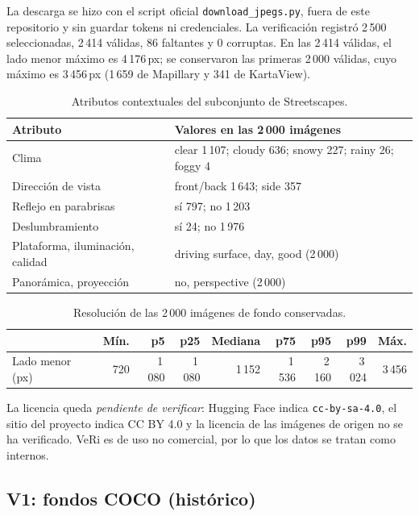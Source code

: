 \documentclass[11pt,a4paper]{article}
\begin{document}
La descarga se hizo con el script oficial \texttt{download\_jpegs.py}, fuera de este
repositorio y sin guardar tokens ni credenciales. La verificaci\'on registr\'o 2\,500
seleccionadas, 2\,414 v\'alidas, 86 faltantes y 0 corruptas. En las 2\,414 v\'alidas, el
lado menor m\'aximo es 4\,176\,px; se conservaron las primeras 2\,000 v\'alidas, cuyo
m\'aximo es 3\,456\,px (1\,659 de Mapillary y 341 de KartaView).

\begin{table}[ht]
\centering
\begin{tabular}{@{}ll@{}}
\toprule
Atributo & Valores en las 2\,000 im\'agenes \\
\midrule
Clima & clear 1\,107; cloudy 636; snowy 227; rainy 26; foggy 4 \\
Direcci\'on de vista & front/back 1\,643; side 357 \\
Reflejo en parabrisas & s\'i 797; no 1\,203 \\
Deslumbramiento & s\'i 24; no 1\,976 \\
Plataforma, iluminaci\'on, calidad & driving surface, day, good (2\,000) \\
Panor\'amica, proyecci\'on & no, perspective (2\,000) \\
\bottomrule
\end{tabular}
\caption{Atributos contextuales del subconjunto de Streetscapes.}
\end{table}

\begin{table}[ht]
\centering
\begin{tabular}{@{}lrrrrrrrr@{}}
\toprule
 & M\'in. & p5 & p25 & Mediana & p75 & p95 & p99 & M\'ax. \\
\midrule
Lado menor (px) & 720 & 1\,080 & 1\,080 & 1\,152 & 1\,536 & 2\,160 & 3\,024 & 3\,456 \\
\bottomrule
\end{tabular}
\caption{Resoluci\'on de las 2\,000 im\'agenes de fondo conservadas.}
\end{table}

La licencia queda \emph{pendiente de verificar}: Hugging Face indica \texttt{cc-by-sa-4.0},
el sitio del proyecto indica CC BY 4.0 y la licencia de las im\'agenes de origen no se ha
verificado. VeRi es de uso no comercial, por lo que los datos se tratan como internos.

\subsection{V1: fondos COCO (hist\'orico)}
\end{document}
